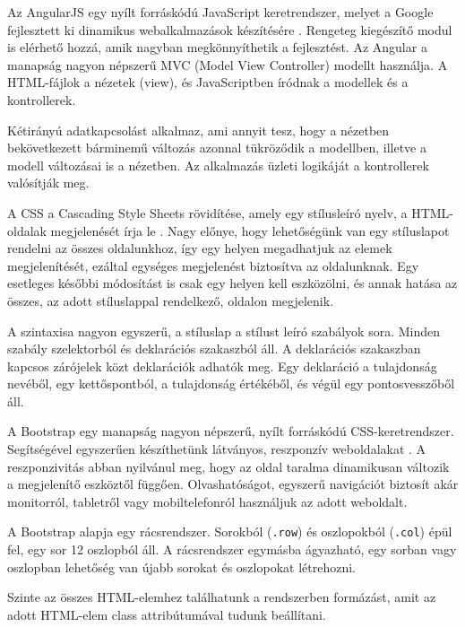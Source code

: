 
Az AngularJS egy nyílt forráskódú JavaScript keretrendszer, melyet a Google fejlesztett ki dinamikus webalkalmazások készítésére \cite{angularjs}. Rengeteg kiegészítő modul is elérhető hozzá, amik nagyban megkönnyíthetik a fejlesztést. Az Angular a manapság nagyon népszerű MVC (Model View Controller) modellt használja. A HTML-fájlok a nézetek (view), és JavaScriptben íródnak a modellek és a kontrollerek.

Kétirányú adatkapcsolást alkalmaz, ami annyit tesz, hogy a nézetben bekövetkezett bárminemű változás azonnal tükröződik a modellben, illetve a modell változásai is a nézetben. Az alkalmazás üzleti logikáját a kontrollerek valósítják meg.


A CSS a Cascading Style Sheets rövidítése, amely egy stílusleíró nyelv, a HTML-oldalak megjelenését írja le \cite{css}. Nagy előnye, hogy lehetőségünk van egy stíluslapot rendelni az összes oldalunkhoz, így egy helyen megadhatjuk az elemek megjelenítését, ezáltal egységes megjelenést biztosítva az oldalunknak. Egy esetleges későbbi módosítást is csak egy helyen kell eszközölni, és annak hatása az összes, az adott stíluslappal rendelkező, oldalon megjelenik.

A szintaxisa nagyon egyszerű, a stíluslap a stílust leíró szabályok sora. Minden szabály szelektorból és deklarációs szakaszból áll. A deklarációs szakaszban kapcsos zárójelek közt deklarációk adhatók meg. Egy deklaráció a tulajdonság nevéből, egy kettőspontból, a tulajdonság értékéből, és végül egy pontosvesszőből áll.


A Bootstrap egy manapság nagyon népszerű, nyílt forráskódú CSS-keretrendszer. Segítségével egyszerűen készíthetünk látványos, reszponzív weboldalakat \cite{bootstrap}. A reszponzivitás abban nyilvánul meg, hogy az oldal taralma dinamikusan változik a megjelenítő eszköztől függően. Olvashatóságot, egyszerű navigációt biztosít akár monitorról, tabletről vagy mobiltelefonról használjuk az adott weboldalt.

A Bootstrap alapja egy rácsrendszer. Sorokból (\texttt{.row}) és oszlopokból (\texttt{.col}) épül fel, egy sor 12 oszlopból áll. A rácsrendszer egymásba ágyazható, egy sorban vagy oszlopban lehetőség van újabb sorokat és oszlopokat létrehozni.

Szinte az összes HTML-elemhez találhatunk a rendszerben formázást, amit az adott HTML-elem class attribútumával tudunk beállítani.

